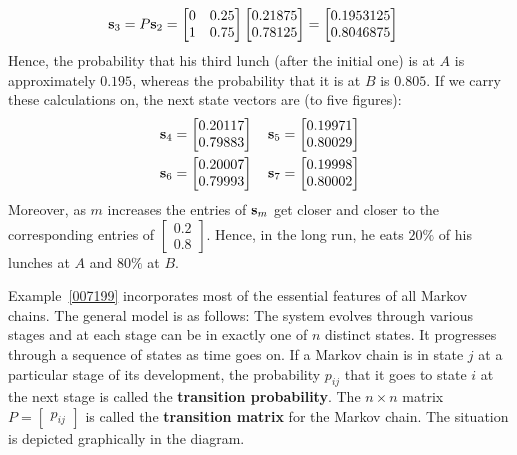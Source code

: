 \documentclass{ximera}
\begin{document}
\begin{example}
\begin{explanation}
\begin{align*}
{\bf s}_{3} &= P{\bf s}_2 = \begin{bmatrix}
0 & 0.25 \\
1 & 0.75
\end{bmatrix}
\begin{bmatrix}
0.21875 \\
0.78125
\end{bmatrix} =
\begin{bmatrix}
0.1953125 \\
0.8046875
\end{bmatrix}
\end{align*}
Hence, the probability that his third lunch (after the initial one) is at $A$ is approximately $0.195$, whereas the probability that it is at $B$ is $0.805$. If we carry these calculations on, the next state vectors are (to five figures):
\begin{align*}
{\bf s}_4 &= \begin{bmatrix}
0.20117 \\
0.79883
\end{bmatrix}
\quad {\bf s}_5 = \begin{bmatrix}
0.19971 \\
0.80029
\end{bmatrix} \\
{\bf s}_6 &= \begin{bmatrix}
0.20007 \\
0.79993
\end{bmatrix} \quad {\bf s}_7 = \begin{bmatrix}
0.19998 \\
0.80002
\end{bmatrix}
\end{align*}
Moreover, as $m$ increases the entries of ${\bf s}_{m}$ get closer and closer to the corresponding entries of $\begin{bmatrix}
0.2 \\
0.8
\end{bmatrix}$.
 Hence, in the long run, he eats $20\%$ of his lunches at $A$ and $80\%$ at $B$.
\end{explanation}
\end{example}


%


Example~\ref{007199} incorporates most of the essential features of all Markov chains. The general model is as follows: The system evolves through various stages and at each stage can be in exactly one of $n$ distinct states. It progresses through a sequence of states as time goes on. If a Markov chain is in state $j$ at a particular stage of its development, the probability $p_{ij}$ that it goes to state $i$ at the next stage is called the \textbf{transition probability}. The $n \times n$ matrix $P = \begin{bmatrix}
p_{ij}
\end{bmatrix}$ is called the \textbf{transition matrix} for the Markov chain. The situation is depicted graphically in the diagram.
\end{document}
